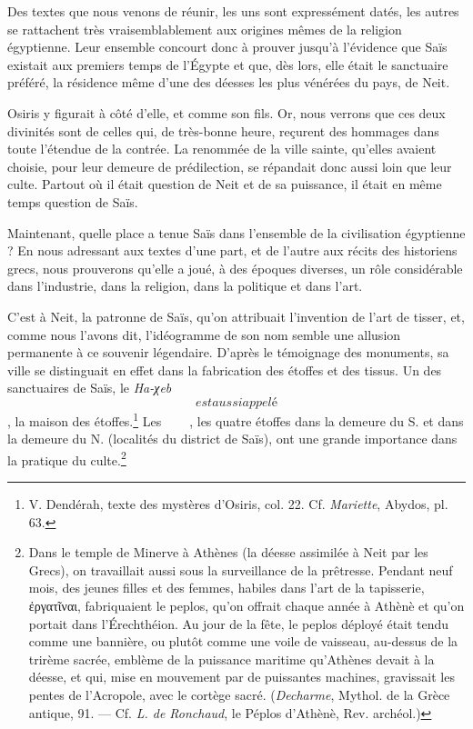 \documentclass[a4paper, 11pt, oneside]{article}
\newcommand*\hieroglyhicsAAAU{}
\newcommand*\hieroglyhicsAAAX{}
\newcommand*\hieroglyhicsAADR{}
\newcommand*\hieroglyhicsAADV{\raisebox{0.5ex}{}}
\newcommand*\hieroglyhicsAAFW{}
\newcommand*\hieroglyhicsAAFX{}
\newcommand*\hieroglyhicsAAFY{}
\newcommand*\hieroglyhicsAAFZ{\raisebox{0.5ex}{}}
\newcommand*\hieroglyhicsAAGA{}
\newcommand*\hieroglyhicsAAGB{}
\begin{document}
Des textes que nous venons de réunir, les uns sont expressément datés, les autres se rattachent très vraisemblablement aux origines mêmes de la religion égyptienne. Leur ensemble concourt donc à prouver jusqu'à l'évidence que Saïs existait aux premiers temps de l'Égypte et que, dès lors, elle était le sanctuaire préféré, la résidence même d'une des déesses les plus vénérées du pays, de Neit.

Osiris y figurait à côté d'elle, et comme son fils. Or, nous verrons que ces deux divinités sont de celles qui, de très-bonne heure, reçurent des hommages dans toute l'étendue de la contrée. La renommée de la ville sainte, qu'elles avaient choisie, pour leur demeure de prédilection, se répandait donc aussi loin que leur culte. Partout où il était question de Neit et de sa puissance, il était en même temps question de Saïs.

Maintenant, quelle place a tenue Saïs dans l'ensemble de la civilisation égyptienne ? En nous adressant aux textes d'une part, et de l'autre aux récits des historiens grecs, nous prouverons qu'elle a joué, à des époques diverses, un rôle considérable dans l'industrie, dans la religion, dans la politique et dans l'art.

C'est à Neit, la patronne de Saïs, qu'on attribuait l'invention de l'art de tisser, et, comme nous l'avons dit, l'idéogramme de son nom semble une allusion permanente à ce souvenir légendaire. D'après le témoignage des monuments, sa ville se distinguait en effet dans la fabrication des étoffes et des tissus. Un des sanctuaires de Saïs, le \emph{Ha-χeb} $\hieroglyhicsAAFW$ est aussi appelé $\hieroglyhicsAAFX$, la maison des étoffes.\footnote{V. Dendérah, texte des mystères d'Osiris, col. 22. Cf. \emph{Mariette}, Abydos, pl. 63.} Les $\hieroglyhicsAAFY\:\hieroglyhicsAAFZ\:\hieroglyhicsAAGA\allowbreak\:\hieroglyhicsAADV\:\hieroglyhicsAAAX\:\hieroglyhicsAADR\allowbreak\:\hieroglyhicsAAAU\:\hieroglyhicsAAGB\:\hieroglyhicsAAAU$, les quatre étoffes dans la demeure du S. et dans la demeure du N. (localités du district de Saïs), ont une grande importance dans la pratique du culte.\footnote{Dans le temple de Minerve à Athènes (la déesse assimilée à Neit par les Grecs), on travaillait aussi sous la surveillance de la prêtresse. Pendant neuf mois, des jeunes filles et des femmes, habiles dans l'art de la tapisserie, ἐργατῖναι, fabriquaient le peplos, qu'on offrait chaque année à Athènè et qu'on portait dans l'Érechthéion. Au jour de la fête, le peplos déployé était tendu comme une bannière, ou plutôt comme une voile de vaisseau, au-dessus de la trirème sacrée, emblème de la puissance maritime qu'Athènes devait à la déesse, et qui, mise en mouvement par de puissantes machines, gravissait les pentes de l'Acropole, avec le cortège sacré. (\emph{Decharme}, Mythol. de la Grèce antique, 91. --- Cf. \emph{L. de Ronchaud}, le Péplos d'Athènè, Rev. archéol.)}
\end{document}
